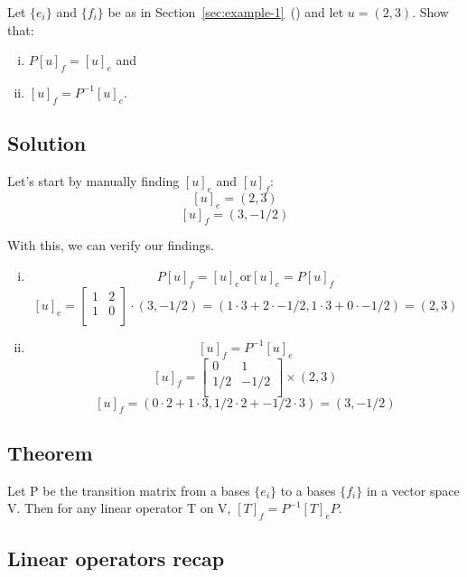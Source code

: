 \documentclass{book}
\begin{document}
Let \(\{e_i\}\) and \(\{f_i\}\) be as in Section~\ref{sec:example-1}~() and let \(u = (2, 3)\). Show that:

\begin{enumerate}[i.]
	\item \(P{[u]}_f = {[u]}_e\) and
	\item \({[u]}_f = P^{-1}{[u]}_e\).
\end{enumerate}

\subsection*{Solution}

Let's start by manually finding \({[u]}_e\) and \({[u]}_f\):
\[{[u]}_e = (2, 3)\]
\[{[u]}_f = (3, -1/2)\]

With this, we can verify our findings.

\begin{enumerate}[i.]
	\item \[P{[u]}_f = {[u]}_e \text{or} {[u]}_e = P{[u]}_f\]
		\[{[u]}_e = \begin{bmatrix}
			1 & 2 \\
			1 & 0 \\
		\end{bmatrix}
		\cdot
		(3, -1/2) = (1 \cdot 3 + 2 \cdot -1/2, 1 \cdot 3 + 0 \cdot -1/2) = (2, 3)\]

	\item \[{[u]}_f = P^{-1}{[u]}_e\]
		\[{[u]}_f = \begin{bmatrix}
			0 & 1 \\
			1/2 & -1/2 \\
		\end{bmatrix}
		\times
		(2, 3)\]
		\[{[u]}_f = (0 \cdot 2 + 1 \cdot 3, 1/2 \cdot 2 + -1/2 \cdot 3) = (3, -1/2)\]
\end{enumerate}

\subsection{Theorem}

Let P be the transition matrix from a bases \(\{e_i\}\) to a bases \(\{f_i\}\) in a vector space V. Then for any linear operator T on V, \({[T]}_f = P^{-1} {[T]}_e P\).

\subsection{Linear operators recap}
\end{document}

